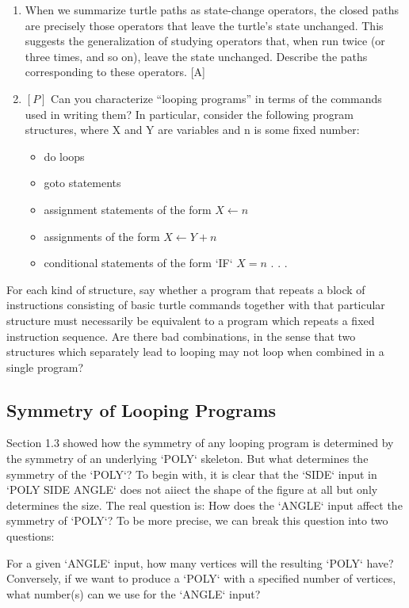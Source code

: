 \documentclass{book}
\begin{document}
\begin{enumerate}
\item When we summarize turtle paths as state-change operators, the
closed paths are precisely those operators that leave the turtle's state
unchanged. This suggests the generalization of studying operators that,
when run twice (or three times, and so on), leave the state unchanged.
Describe the paths corresponding to these operators. [A]

\item $[P]$ Can you characterize ``looping programs'' in terms of the commands used in writing them? In particular, consider the following program structures, where X and Y are variables and n is some fixed number:
\begin{itemize}
\item do loops
\item goto statements
\item assignment statements of the form $X \leftarrow n$
\item assignments of the form $X \leftarrow Y + n$
\item conditional statements of the form \textsc{`IF`} $X = n$ . . .
\end{itemize}
\end{enumerate}
\indent
For each kind of structure, say whether a program that repeats a block
of instructions consisting of basic turtle commands together with that
particular structure must necessarily be equivalent to a program which
repeats a fixed instruction sequence. Are there bad combinations, in the
sense that two structures which separately lead to looping may not loop
when combined in a single program?

\subsection{Symmetry of Looping Programs}

Section 1.3 showed how the symmetry of any looping program is determined by the symmetry of an underlying \textsc{`POLY`} skeleton. But what determines the symmetry of the \textsc{`POLY`}? To begin with, it is clear that the \textsc{`SIDE`} input in \textsc{`POLY SIDE ANGLE`} does not aiiect the shape of the figure at all but only determines the size. The real question is: How does the \textsc{`ANGLE`} input affect the symmetry of \textsc{`POLY`}? To be more precise, we can break this question into two questions:

For a given \textsc{`ANGLE`} input, how many vertices will the resulting \textsc{`POLY`} have?
Conversely, if we want to produce a \textsc{`POLY`} with a specified number of
vertices, what number(s) can we use for the \textsc{`ANGLE`} input?
\end{document}
